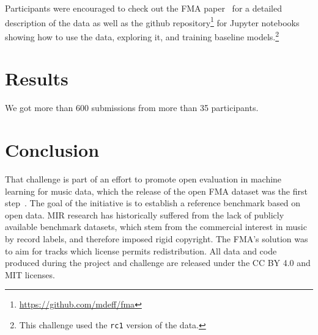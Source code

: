 \documentclass[sigconf]{acmart}
\begin{document}
Participants were encouraged to check out the FMA paper~\cite{fma_dataset} for a detailed description of the data as well as the github repository\footnote{\url{https://github.com/mdeff/fma}} for Jupyter notebooks showing how to use the data, exploring it, and training baseline models.\footnote{This challenge used the \texttt{rc1} version of the data.}

\section{Results}


We got more than 600 submissions from more than 35 participants.

\section{Conclusion}

That challenge is part of an effort to promote open evaluation in machine learning for music data, which the release of the open FMA dataset was the first step~\cite{fma_dataset}. The goal of the initiative is to establish a reference benchmark based on open data. MIR research has historically suffered from the lack of publicly available benchmark datasets, which stem from the commercial interest in music by record labels, and therefore imposed rigid copyright. The FMA's solution was to aim for tracks which license permits redistribution. All data and code produced during the project and challenge are released under the CC BY 4.0 and MIT licenses.




\end{document}
